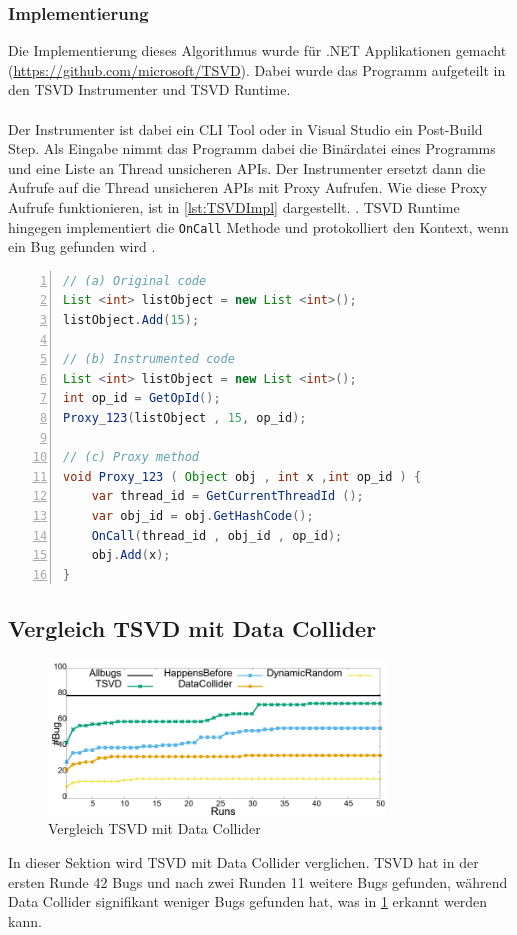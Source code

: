 \subsubsection*{Implementierung}

Die Implementierung dieses Algorithmus wurde für .NET Applikationen gemacht (\url{https://github.com/microsoft/TSVD}). Dabei wurde das Programm aufgeteilt in den \acs{TSVD} Instrumenter und \acs{TSVD} Runtime. \\ 
\\
Der Instrumenter ist dabei ein \ac{CLI} Tool oder in Visual Studio ein Post-Build Step. Als Eingabe nimmt das Programm dabei die Binärdatei eines Programms und eine Liste an Thread unsicheren \ac{API}s. Der Instrumenter ersetzt dann die Aufrufe auf die Thread unsicheren \acs{API}s mit Proxy Aufrufen. Wie diese Proxy Aufrufe funktionieren, ist in \ref{lst:TSVDImpl} dargestellt. \cite[vgl.][170]{li_efficient_2019}. \acs{TSVD} Runtime hingegen implementiert die \texttt{OnCall} Methode und protokolliert den Kontext, wenn ein Bug gefunden wird \cite[vgl.][170-171]{li_efficient_2019}.
\\
\begin{lstlisting}[language=Java,frame=tb,caption={\acs{TSVD} Proxy Aufrufe}, label={lst:TSVDImpl}, numbers=left, stepnumber=1, captionpos=b, tabsize=4]
// (a) Original code
List <int> listObject = new List <int>();
listObject.Add(15); 
      
// (b) Instrumented code 
List <int> listObject = new List <int>(); 
int op_id = GetOpId(); 
Proxy_123(listObject , 15, op_id); 
     
// (c) Proxy method
void Proxy_123 ( Object obj , int x ,int op_id ) { 
    var thread_id = GetCurrentThreadId (); 
    var obj_id = obj.GetHashCode(); 
    OnCall(thread_id , obj_id , op_id); 
    obj.Add(x);
}
\end{lstlisting}

\subsection*{Vergleich TSVD mit Data Collider}

\begin{figure}[ht]
    \centering
    \includegraphics[width=0.8\textwidth]{gfx/TSVDvDataCollider.png}
    \caption{Vergleich TSVD mit Data Collider \cite[173]{li_efficient_2019}}
    \label{fig:TSVDvDataCollider}
\end{figure}

In dieser Sektion wird \acs{TSVD} mit Data Collider verglichen. \acs{TSVD} hat in der ersten Runde 42 Bugs und nach zwei Runden 11 weitere Bugs gefunden, während Data Collider signifikant weniger Bugs gefunden hat, was in \ref{fig:TSVDvDataCollider} erkannt werden kann.